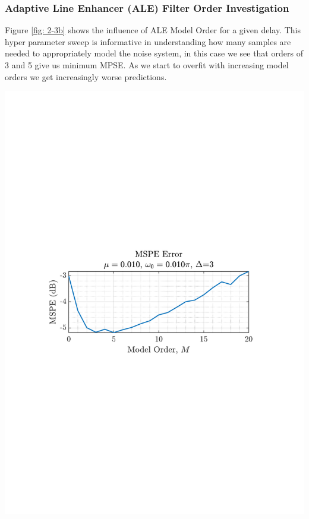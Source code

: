 \documentclass[12pt]{article}
\numberwithin{equation}{section}
\begin{document}
	\subsubsection{Adaptive Line Enhancer (ALE) Filter Order Investigation}
		\begin{minipage}[b]{0.49\textwidth}
			Figure \ref{fig: 2-3b} shows the influence of ALE Model Order for a given delay. This hyper parameter sweep is informative in understanding how many samples are needed to appropriately model the noise system, in this case we see that orders of 3 and 5 give us minimum MPSE. As we start to overfit with increasing model orders we get increasingly worse predictions.
		\end{minipage}%
		\begin{minipage}{0.04\textwidth}
			\hspace*{0.04\textwidth}
		\end{minipage}%
		\begin{minipage}[t]{0.49\textwidth}
			\centering
			\includegraphics[trim={2.2cm 11.2cm 3.15cm  11.2cm}, clip, width=\textwidth]{../MATLAB/figures/q2_3b_fig03.pdf} 
			\captionsetup{justification=centering}
			\label{fig: 2-3b}
		\end{minipage}%
		
\end{document}
